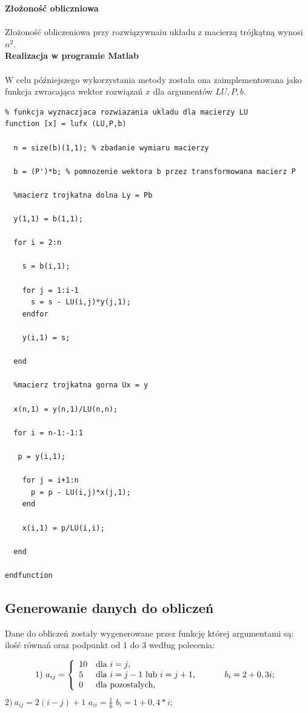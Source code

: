 \documentclass[a4paper, 11pt]{article}
\begin{document}
\textbf{Złożoność obliczniowa}\\
\\
Złożoność obliczeniowa przy rozwiązywnaiu układu z macierzą trójkątną wynosi $n^2$.\\

\textbf{Realizacja w programie Matlab}\\
\\
W celu późniejszego wykorzystania metody została ona zaimplementowana jako funkcja zwracająca wektor rozwiązań $x$ dla argumentów $LU,P,b$.

\begin{lstlisting}
% funkcja wyznaczjaca rozwiazania ukladu dla macierzy LU
function [x] = lufx (LU,P,b)

  n = size(b)(1,1); % zbadanie wymiaru macierzy

  b = (P')*b; % pomnozenie wektora b przez transformowana macierz P

  %macierz trojkatna dolna Ly = Pb

  y(1,1) = b(1,1);

  for i = 2:n

    s = b(i,1);
  
    for j = 1:i-1
      s = s - LU(i,j)*y(j,1);
    endfor
  
    y(i,1) = s;
  
  end

  %macierz trojkatna gorna Ux = y

  x(n,1) = y(n,1)/LU(n,n);

  for i = n-1:-1:1

   p = y(i,1);
  
    for j = i+1:n
      p = p - LU(i,j)*x(j,1);
    end
  
    x(i,1) = p/LU(i,i);
  
  end

endfunction

\end{lstlisting}

\subsection{Generowanie danych do obliczeń}
Dane do obliczeń zostały wygenerowane przez funkcję której argumentami są: ilość równań oraz podpunkt od 1 do 3 według polecenia:

$$
1) \ a_{ij} = \left\{ \begin{array}{ll}
10 & \textrm{dla $i=j$,}\\
5 & \textrm{dla $i=j-1$ lub $i=j+1$, \hspace{1cm} $b_{i} = 2+0,3i$;}\\
0 & \textrm{dla pozostalych,}
\end{array} \right.
$$
\hspace{3cm} $2) \ a_{ij} = 2(i-j)+1$ \hspace{1cm} $a_{ii} = \frac{1}{6}$ \hspace{1cm} $b_{i} =1+0,4*i$; \\
\end{document}
